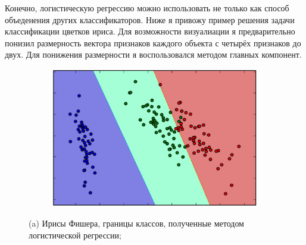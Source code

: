 Конечно, логистическую регрессию можно использовать не только как способ объеденения других классификаторов. Ниже я привожу пример решения задачи классификации цветков ириса. Для возможности визуалиации  я предварительно понизил размерность вектора признаков каждого объекта с четырёх признаков до двух. Для понижения размерности я воспользовался методом главных компонент.

\begin{figure}[ht]
	\centering
    \begin{subfigure}[b]{1\textwidth}
    \centering
        \includegraphics[scale=0.5]{pasted-image-19.png}
        \caption{}
    \end{subfigure}
 
    \caption{(a) Ирисы Фишера, границы классов, полученные методом логистической регрессии;}
    \label{fig_parsetree}
\end{figure}
